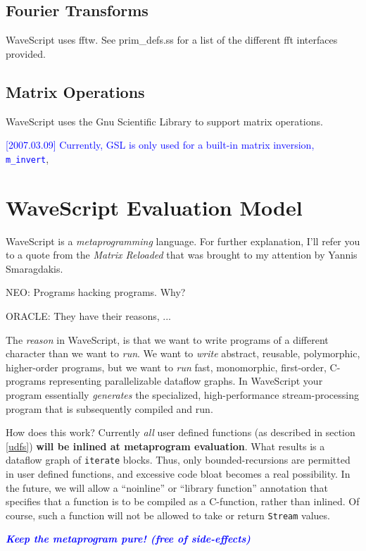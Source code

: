 \documentclass[twocolumn]{report}
\newcommand{\rednote}[1]{{\textcolor{blue}{#1}}}
\begin{document}
\section{Fourier Transforms}

WaveScript uses fftw.  See prim\_defs.ss for a list of the different
fft interfaces provided.

\section{Matrix Operations}

WaveScript uses the Gnu Scientific Library to support matrix operations.

\rednote{[2007.03.09] Currently, GSL is only used for a built-in matrix
  inversion, {\tt m\_invert}}, 

\chapter{WaveScript Evaluation Model}

WaveScript is a {\em metaprogramming} language.  For further
explanation, I'll refer you to a quote from the {\em Matrix Reloaded}
that was brought to my attention by Yannis Smaragdakis.

\begin{center}
NEO: Programs hacking programs. Why?

ORACLE: They have their reasons, ...
\end{center}

The {\em reason} in WaveScript, is that we want to write programs of a
different character than we want to {\em run}.
We want to {\em write}
abstract, reusable, polymorphic, higher-order programs, but we want to
{\em run} fast, monomorphic, first-order, C-programs representing
parallelizable dataflow graphs.
In WaveScript your program essentially {\em
generates} the specialized, high-performance stream-processing
program that is subsequently compiled and run.  


How does this work?  Currently {\em all} user defined functions (as
described in section \ref{udfs}) {\bf will be inlined at metaprogram
evaluation}.  What results is a dataflow graph of {\tt iterate} blocks.
Thus, only bounded-recursions are permitted in user defined functions,
and excessive code bloat becomes a real possibility.  In the future, we will
allow a ``noinline'' or ``library function'' annotation that specifies
that a function is to be compiled as a C-function, rather than
inlined.  Of course, such a function will not be allowed to take or
return {\tt Stream} values.

\rednote{\em \bf Keep the metaprogram pure! (free of side-effects)}
\end{document}
